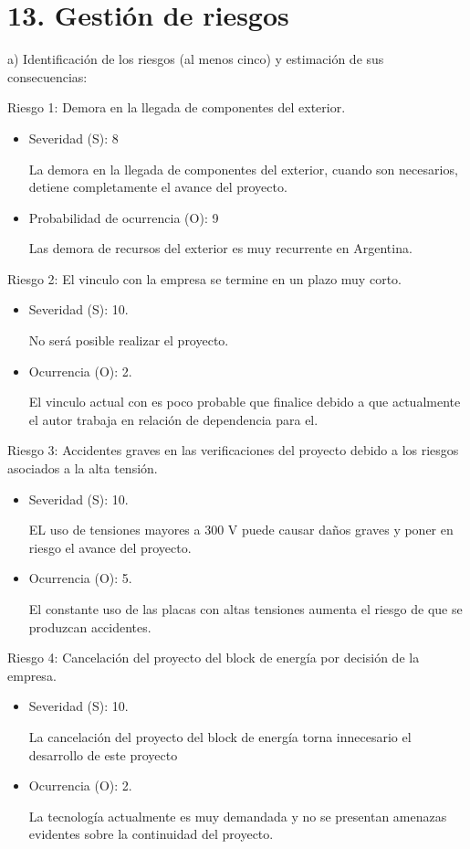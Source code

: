 \documentclass[
11pt, %
codirector, %
]{charter}
\begin{document}
\section{13. Gestión de riesgos}
\label{sec:riesgos}

a) Identificación de los riesgos (al menos cinco) y estimación de sus consecuencias:

Riesgo 1: Demora en la llegada de componentes del exterior.
\begin{itemize}
	\item Severidad (S): 8

	      La demora en la llegada de componentes del exterior, cuando son necesarios, detiene completamente el avance del proyecto.
	\item Probabilidad de ocurrencia (O): 9

	      Las demora de recursos del exterior es muy recurrente en Argentina.
\end{itemize}

Riesgo 2: El vinculo con la empresa se termine en un plazo muy corto.
\begin{itemize}
	\item Severidad (S): 10.

	      No será posible realizar el proyecto.
	\item Ocurrencia (O): 2.

	      El vinculo actual con \clientename\hspace{1px}  es poco probable que finalice debido a que actualmente el autor trabaja en relación de dependencia para el.
\end{itemize}

Riesgo 3: Accidentes graves en las verificaciones del proyecto debido a los riesgos asociados a la alta tensión.
\begin{itemize}
	\item Severidad (S): 10.

	      EL uso de tensiones mayores a 300 V puede causar daños graves y poner en riesgo el avance del proyecto.
	\item Ocurrencia (O): 5.

	      El constante uso de las placas con altas tensiones aumenta el riesgo de que se produzcan accidentes.
\end{itemize}

Riesgo 4: Cancelación del proyecto del block de energía por decisión de la empresa.
\begin{itemize}
	\item Severidad (S): 10.

	      La cancelación del proyecto del block de energía torna innecesario el desarrollo de este proyecto
	\item Ocurrencia (O): 2.

	      La tecnología actualmente es muy demandada y no se presentan amenazas evidentes sobre la continuidad del proyecto.
\end{itemize}
\end{document}
